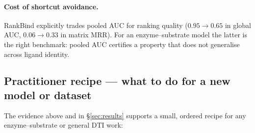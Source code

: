 \documentclass[11pt,a4paper]{article}
\newcommand{\method}{RankBind\xspace}
\newcommand{\gauc}{global AUC}
\newcommand{\matmrr}{matrix MRR}
\begin{document}
\paragraph{Cost of shortcut avoidance.}
\method explicitly trades pooled AUC for ranking quality ($0.95 \to 0.65$ in
\gauc, $0.06 \to 0.33$ in \matmrr). For an enzyme--substrate model the latter
is the right benchmark: pooled AUC certifies a property that does not
generalise across ligand identity.

\subsection{Practitioner recipe --- what to do for a new model or dataset}
\label{sec:recipe}

The evidence above and in \S\ref{sec:results} supports a small, ordered
recipe for any enzyme--substrate or general DTI work:
\end{document}
